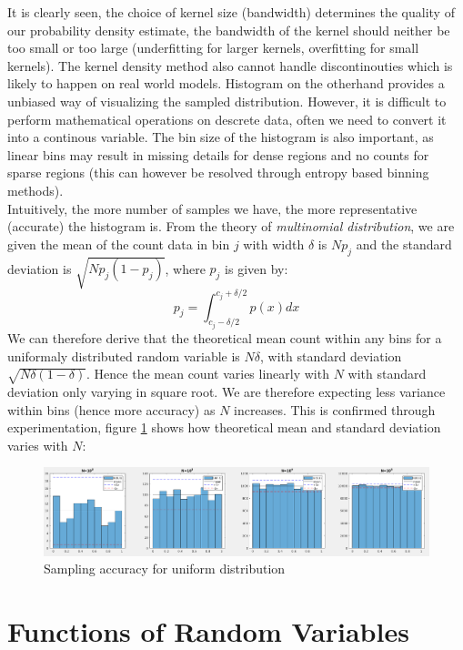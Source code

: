 \documentclass{article}
\begin{document}
It is clearly seen, the choice of kernel size (bandwidth) determines the quality of our probability density estimate, the bandwidth of the kernel should neither be too small or too large (underfitting for larger kernels, overfitting for small kernels). The kernel density method also cannot handle discontinouties which is likely to happen on real world models. Histogram on the otherhand provides a unbiased way of visualizing the sampled distribution. However, it is difficult to perform mathematical operations on descrete data, often we need to convert it into a continous variable. The bin size of the histogram is also important, as linear bins may result in missing details for dense regions and no counts for sparse regions (this can however be resolved through entropy based binning methods).\\
Intuitively, the more number of samples we have, the more representative (accurate) the histogram is. From the theory of \textit{multinomial distribution}, we are given the mean of the count data in bin $j$ with width $\delta$ is $Np_j$ and the standard deviation is $\sqrt{Np_j(1-p_j)}$, where $p_j$ is given by:
$$
p_j = \int_{c_j-\delta/2}^{c_j+\delta/2}p(x)dx
$$
We can therefore derive that the theoretical mean count within any bins for a uniformaly distributed random variable is $N\delta$, with standard deviation $\sqrt{N\delta(1-\delta)}$. Hence the mean count varies linearly with $N$ with standard deviation only varying in square root. We are therefore expecting less variance within bins (hence more accuracy) as $N$ increases. This is confirmed through experimentation, figure \ref{fig:bins} shows how theoretical mean and standard deviation varies with $N$:
\begin{figure}[htp]
	\centering
	\includegraphics[width=\linewidth]{task_1_2.png}
	\caption{Sampling accuracy for uniform distribution}
	\label{fig:bins}
\end{figure}

\section{Functions of Random Variables}
\newcommand\given[1][]{\:#1\vert\:}
\end{document}

